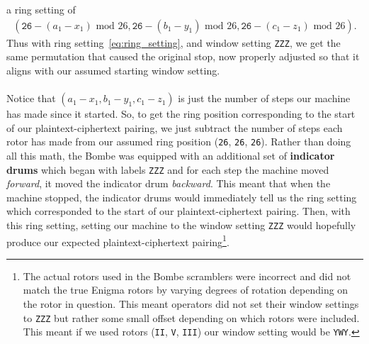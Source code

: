 a ring setting of
\begin{align}
  \label{eq:ring_setting}
  (\texttt{26} - (a_1-x_1)\text{ mod }26, \texttt{26} -
  (b_1-y_1)\text{ mod }26, \texttt{26} - (c_1-z_1)\text{ mod }26).
\end{align}
Thus with ring setting~\ref{eq:ring_setting}, and window setting
\texttt{ZZZ}, we get the same permutation that caused the original
stop, now properly adjusted so that it aligns with our assumed
starting window setting.
\\\\Notice that $(a_1-x_1, b_1-y_1, c_1-z_1)$ is just the number of steps
our machine has made since it started. So, to get the ring position
corresponding to the start of our plaintext-ciphertext pairing, we
just subtract the number of steps each rotor has made from our
assumed ring position (\texttt{26}, \texttt{26}, \texttt{26}). Rather
than doing all this math, the Bombe was equipped with an additional
set of {\bf{indicator drums}} which began with labels \texttt{ZZZ}
and for each step the machine moved \emph{forward}, it moved the
indicator drum \emph{backward}. This meant that when the machine
stopped, the indicator drums would immediately tell us the ring
setting which corresponded to the start of our plaintext-ciphertext
pairing. Then,
with this ring setting, setting our machine to the window setting
\texttt{ZZZ} would hopefully produce our expected plaintext-ciphertext
pairing\footnote{The actual rotors used in the Bombe scramblers were
  incorrect and did not match the true Enigma rotors by varying degrees
  of rotation depending on the rotor in question. This meant operators
  did not set their window settings to \texttt{ZZZ} but rather some
  small offset depending on which rotors were included. This meant if
  we used rotors (\texttt{II}, \texttt{V}, \texttt{III}) our window
setting would be \texttt{YWY}.}.

